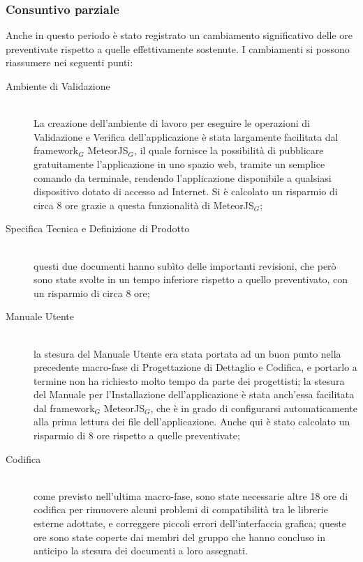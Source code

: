 \subsubsection{Consuntivo parziale}
Anche in questo periodo è stato registrato un cambiamento significativo delle ore preventivate rispetto a quelle effettivamente sostenute. I cambiamenti si possono riassumere nei seguenti punti:
\begin{description}
\item[Ambiente di Validazione] \hfill \\
La creazione dell'ambiente di lavoro per eseguire le operazioni di Validazione e Verifica dell'applicazione è stata largamente facilitata dal framework$_G$ MeteorJS$_G$, il quale fornisce la possibilità di pubblicare gratuitamente l'applicazione in uno spazio web, tramite un semplice comando da terminale, rendendo l'applicazione disponibile a qualsiasi dispositivo dotato di accesso ad Internet. Si è calcolato un risparmio di circa 8 ore grazie a questa funzionalità di MeteorJS$_G$;
\item[Specifica Tecnica e Definizione di Prodotto] \hfill \\
questi due documenti hanno subìto delle importanti revisioni, che però sono state svolte in un tempo inferiore rispetto a quello preventivato, con un risparmio di circa 8 ore;
\item[Manuale Utente] \hfill \\
la stesura del Manuale Utente era stata portata ad un buon punto nella precedente macro-fase di Progettazione di Dettaglio e Codifica, e portarlo a termine non ha richiesto molto tempo da parte dei progettisti; la stesura del Manuale per l'Installazione dell'applicazione è stata anch'essa facilitata dal framework$_G$ MeteorJS$_G$, che è in grado di configurarsi automaticamente alla prima lettura dei file dell'applicazione. Anche qui è stato calcolato un risparmio di 8 ore rispetto a quelle preventivate; 
\item[Codifica] \hfill \\
come previsto nell'ultima macro-fase, sono state necessarie altre 18 ore di codifica per rimuovere alcuni problemi di compatibilità tra le librerie esterne adottate, e correggere piccoli errori dell'interfaccia grafica; queste ore sono state coperte dai membri del gruppo che hanno concluso in anticipo la stesura dei documenti a loro assegnati.
\end{description}

